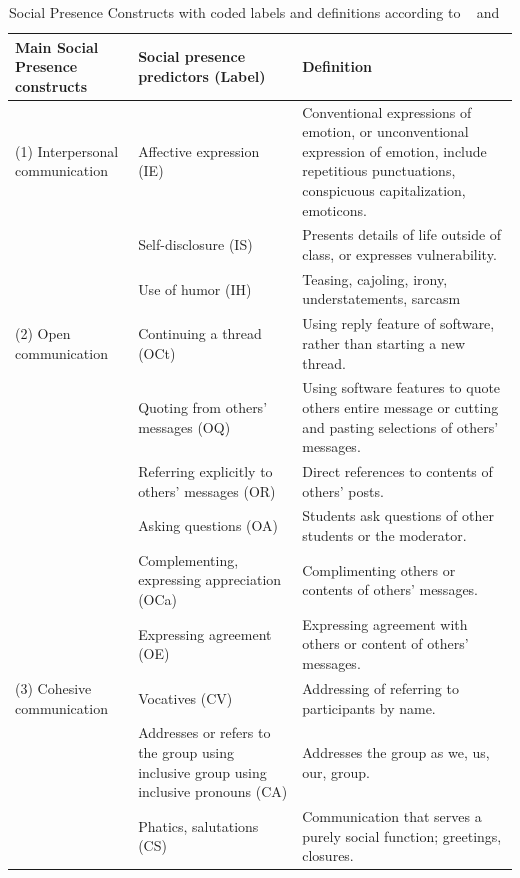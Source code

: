 \documentclass[manuscript,screen,review]{acmart}
\begin{document}
\begin{table}[h!]
\caption{Social Presence Constructs with coded labels and  definitions according to ~\cite{joksimovic2015social} and ~\cite{garrison2009communities}}
 \label{tab:Social}
\begin{center}
    \begin{tabular}{p{3cm}|p{4cm}|p{5cm}}
    \toprule
     \centering Main Social Presence constructs & \centering	Social presence predictors (Label) & Definition  \\
     \midrule
    (1)  Interpersonal communication  &  Affective expression (IE)  & Conventional expressions of emotion, or unconventional expression of emotion, include repetitious punctuations, conspicuous capitalization, emoticons.       
     \\ \hline
      & Self-disclosure (IS) & Presents details of life outside of class, or expresses vulnerability.
    \\ \hline
     & Use of humor (IH)  & Teasing, cajoling, irony, understatements, sarcasm
    \\ \hline
   (2) Open communication & Continuing a thread (OCt) & Using reply feature of software, rather than starting a new thread.
    \\ \hline
     & Quoting from others’ messages (OQ) & Using software features to quote others entire message or cutting and pasting selections of others' messages.
    \\ \hline
     & Referring explicitly to others’ messages (OR) & Direct references to contents of others' posts.
    \\ \hline
     & Asking questions (OA) & Students ask questions of other students or the moderator.
    \\ \hline
     & Complementing, expressing appreciation (OCa) & Complimenting others or contents of others' messages.
    \\ \hline
    & Expressing agreement (OE) & Expressing agreement with others or content of others' messages.
    \\ \hline
    (3) Cohesive communication & Vocatives (CV) & Addressing of referring to participants by name.
    \\ \hline
    & Addresses or refers to the group using inclusive group using inclusive pronouns (CA) & Addresses the group as we, us, our, group.
    \\ \hline
    & Phatics, salutations (CS) & Communication that serves a purely social function; greetings, closures.
    \\ \hline
    \bottomrule
    \end{tabular}
    \end{center}
    \end{table}
\end{document}
